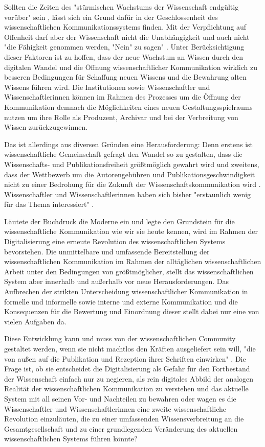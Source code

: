 Sollten die Zeiten des "stürmischen Wachstums der Wissenschaft endgültig vorüber" sein \cite{K_lbel_2002}, lässt sich ein Grund dafür in der Geschlossenheit des wissenschaftlichen Kommunikationssystems finden. Mit der Verpflichtung auf Offenheit darf aber der Wissenschaft nicht die Unabhängigkeit und auch nicht "die Fähigkeit genommen werden, "Nein" zu sagen" \cite{suchen_Hornbostel_2006}. Unter Berücksichtigung dieser Faktoren ist zu hoffen, dass der neue Wachstum an Wissen durch den digitalen Wandel und die Öffnung wissenschaftlicher Kommunikation wirklich zu besseren Bedingungen für Schaffung neuen Wissens und die Bewahrung alten Wissens führen wird. Die Institutionen sowie Wissenschaftler und Wissenschaftlerinnen können im Rahmen des Prozesses um die Öffnung der Kommunikation demnach die Möglichkeiten eines neuen Gestaltungsspielraums nutzen um ihre Rolle als Produzent, Archivar und bei der Verbreitung von Wissen zurückzugewinnen.

Das ist allerdings aus diversen Gründen eine Herausforderung: Denn erstens ist wissenschaftliche Gemeinschaft gefragt den Wandel so zu gestalten, dass die Wissenschafts- und Publikationsfreiheit größtmöglich gewahrt wird und zweitens, dass der Wettbewerb um die Autorengebühren und Publikationsgeschwindigkeit nicht zu einer Bedrohung für die Zukunft der Wissenschaftskommunikation wird \cite{Beall_2012} \cite{Lossau_oa_2007}. Wissenschaftler und Wissenschaftlerinnen haben sich bisher "erstaunlich wenig für das Thema interessiert" \cite{hagner_2015_sache_buches}.

Läutete der Buchdruck die Moderne ein und legte den Grundstein für die wissenschaftliche Kommunikation wie wir sie heute kennen, wird im Rahmen der Digitalisierung eine erneute Revolution des wissenschaftlichen Systems bevorstehen. Die unmittelbare und umfassende Bereitstellung der wissenschaftlichen Kommunikation im Rahmen der alltäglichen wissenschaftlichen Arbeit unter den Bedingungen von größtmöglicher, stellt das wissenschaftlichen System aber innerhalb und außerhalb vor neue Herausforderungen. Das Aufbrechen der strikten Unterscheidung wissenschaftlicher Kommunikation in formelle und informelle sowie interne und externe Kommunikation und die Konsequenzen für die Bewertung und Einordnung dieser stellt dabei nur eine von vielen Aufgaben da.

Diese Entwicklung kann und muss von der wissenschaftlichen Community gestaltet werden, wenn sie nicht machtlos den Kräften ausgeliefert sein will, "die von außen auf die Publikation und Rezeption ihrer Schriften einwirken" \cite{Hirschi_2015_buch_oa}. Die Frage ist, ob sie entscheidet die Digitalisierung als Gefahr für den Fortbestand der Wissenschaft einfach nur zu negieren, als rein digitales Abbild der analogen Realität der wissenschaftlichen Kommunikation zu verstehen und das aktuelle System mit all seinen Vor- und Nachteilen zu bewahren oder wagen es die Wissenschaftler und Wissenschaftlerinnen eine zweite wissenschaftliche Revolution einzuläuten, die zu einer umfassenden Wissensverbreitung an die Gesamtgesellschaft und zu einer grundlegenden Veränderung des aktuellen wissenschaftlichen Systems führen könnte?

